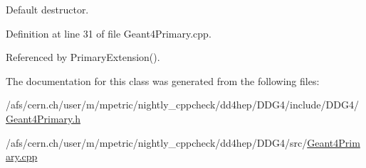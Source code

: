 Default destructor. 



Definition at line 31 of file Geant4\+Primary.\+cpp.



Referenced by Primary\+Extension().



The documentation for this class was generated from the following files\+:\begin{DoxyCompactItemize}
\item 
/afs/cern.\+ch/user/m/mpetric/nightly\+\_\+cppcheck/dd4hep/\+D\+D\+G4/include/\+D\+D\+G4/\hyperlink{_geant4_primary_8h}{Geant4\+Primary.\+h}\item 
/afs/cern.\+ch/user/m/mpetric/nightly\+\_\+cppcheck/dd4hep/\+D\+D\+G4/src/\hyperlink{_geant4_primary_8cpp}{Geant4\+Primary.\+cpp}\end{DoxyCompactItemize}
